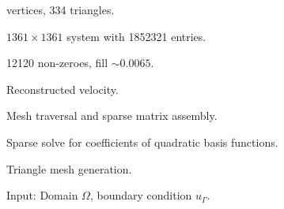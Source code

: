 \documentclass{article}
\begin{document}
 vertices, 334 triangles.

$1361 \times 1361$ system with 1852321 entries.

12120 non-zeroes, fill $\sim 0.0065$.

Reconstructed velocity.

Mesh traversal and sparse matrix assembly.

Sparse solve for coefficients of quadratic basis functions.

Triangle mesh generation.

Input: Domain $\Omega$, boundary condition $u_\Gamma$.
\end{document}
